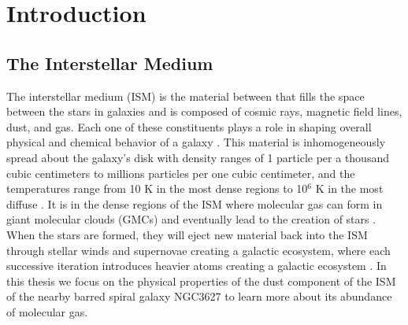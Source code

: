 \chapter{Introduction}\label{intro}

\section{The Interstellar Medium} 

The interstellar medium (ISM) is the material between that fills the space between the stars in galaxies and is composed of cosmic rays, magnetic field lines, dust, and gas.  Each one of these constituents plays a role in shaping overall physical and chemical behavior of a galaxy \citep{ferriere2001}.  This material is inhomogeneously spread about the galaxy's disk with density ranges of 1 particle per a thousand cubic centimeters to millions particles per one cubic centimeter, and the temperatures range from 10 K in the most dense regions to 10$^6$ K in the most diffuse \citep{ferriere2001}.  It is in the dense regions of the ISM where molecular gas can form in giant molecular clouds (GMCs) and eventually lead to the creation of stars \citep{krumholz2014}.  When the stars are formed, they will eject new material back into the ISM through stellar winds and supernovae creating a galactic ecosystem, where each successive iteration introduces heavier atoms creating a galactic ecosystem \citep{ferriere2001}.  In this thesis we focus on the physical properties of the dust component of the ISM of the nearby barred spiral galaxy NGC3627 to learn more about its abundance of molecular gas.


